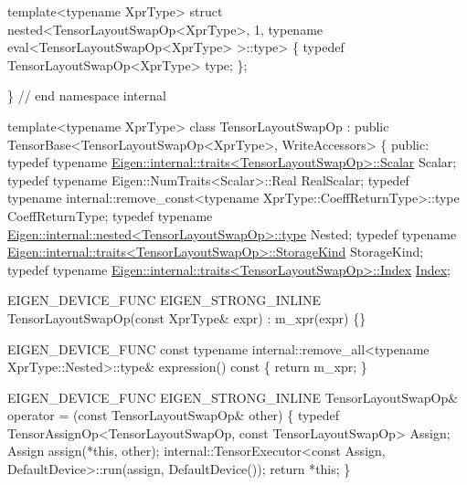 \begin{DoxyCodeInclude}
\textcolor{keyword}{template}<\textcolor{keyword}{typename} XprType>
\textcolor{keyword}{struct }nested<TensorLayoutSwapOp<XprType>, 1, typename eval<TensorLayoutSwapOp<XprType> >::type>
\{
  \textcolor{keyword}{typedef} TensorLayoutSwapOp<XprType> type;
\};

\}  \textcolor{comment}{// end namespace internal}



\textcolor{keyword}{template}<\textcolor{keyword}{typename} XprType>
\textcolor{keyword}{class }TensorLayoutSwapOp : \textcolor{keyword}{public} TensorBase<TensorLayoutSwapOp<XprType>, WriteAccessors>
\{
  \textcolor{keyword}{public}:
  \textcolor{keyword}{typedef} \textcolor{keyword}{typename} \hyperlink{struct_eigen_1_1internal_1_1traits}{Eigen::internal::traits<TensorLayoutSwapOp>::Scalar}
       Scalar;
  \textcolor{keyword}{typedef} \textcolor{keyword}{typename} Eigen::NumTraits<Scalar>::Real RealScalar;
  \textcolor{keyword}{typedef} \textcolor{keyword}{typename} internal::remove\_const<typename XprType::CoeffReturnType>::type CoeffReturnType;
  \textcolor{keyword}{typedef} \textcolor{keyword}{typename} \hyperlink{class_eigen_1_1internal_1_1_tensor_lazy_evaluator_writable}{Eigen::internal::nested<TensorLayoutSwapOp>::type}
       Nested;
  \textcolor{keyword}{typedef} \textcolor{keyword}{typename} \hyperlink{struct_eigen_1_1internal_1_1traits}{Eigen::internal::traits<TensorLayoutSwapOp>::StorageKind}
       StorageKind;
  \textcolor{keyword}{typedef} \textcolor{keyword}{typename} \hyperlink{struct_eigen_1_1internal_1_1traits}{Eigen::internal::traits<TensorLayoutSwapOp>::Index}
       \hyperlink{namespace_eigen_a62e77e0933482dafde8fe197d9a2cfde}{Index};

  EIGEN\_DEVICE\_FUNC EIGEN\_STRONG\_INLINE TensorLayoutSwapOp(\textcolor{keyword}{const} XprType& expr)
      : m\_xpr(expr) \{\}

    EIGEN\_DEVICE\_FUNC
    \textcolor{keyword}{const} \textcolor{keyword}{typename} internal::remove\_all<typename XprType::Nested>::type&
    expression()\textcolor{keyword}{ const }\{ \textcolor{keywordflow}{return} m\_xpr; \}

    EIGEN\_DEVICE\_FUNC
    EIGEN\_STRONG\_INLINE TensorLayoutSwapOp& operator = (\textcolor{keyword}{const} TensorLayoutSwapOp& other)
    \{
      \textcolor{keyword}{typedef} TensorAssignOp<TensorLayoutSwapOp, const TensorLayoutSwapOp> Assign;
      Assign assign(*\textcolor{keyword}{this}, other);
      internal::TensorExecutor<const Assign, DefaultDevice>::run(assign, DefaultDevice());
      \textcolor{keywordflow}{return} *\textcolor{keyword}{this};
    \}


\end{DoxyCodeInclude}
